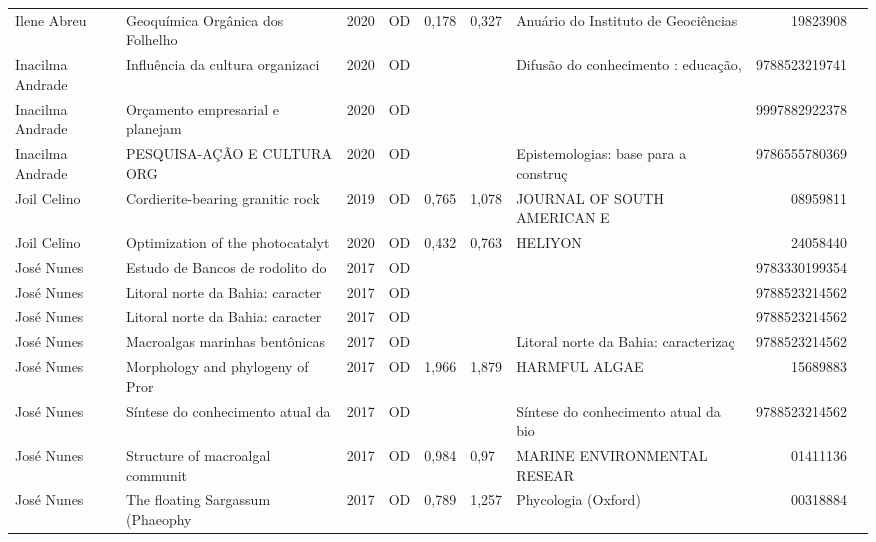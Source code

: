 \documentclass[12pt,brazil]{article}\usepackage[]{graphicx}\usepackage[]{xcolor}
\begin{document}
\begin{longtable}{lllrrllrr}
Ilene Abreu & Geoquímica Orgânica dos Folhelho & 2020 & OD & 0,178 & 0,327 & Anuário do Instituto de Geociências  & 19823908 \\
Inacilma Andrade & Influência da cultura organizaci & 2020 & OD &  &  & Difusão do conhecimento : educação,  & 9788523219741 \\
\rowcolor{ninval}\rowcolor{ninval}\rowcolor{ninval}\rowcolor{ninval}\rowcolor{ninval}\rowcolor{ninval}\rowcolor{ninval}\rowcolor{ninval}\rowcolor{ninval}\rowcolor{ninval}\rowcolor{ninval}\rowcolor{ninval}\rowcolor{ninval}\rowcolor{ninval}\rowcolor{ninval}\rowcolor{ninval}Inacilma Andrade & Orçamento empresarial e planejam & 2020 & OD &  &  &  & 9997882922378 \\
Inacilma Andrade & PESQUISA-AÇÃO E CULTURA ORG & 2020 & OD &  &  & Epistemologias: base para a construç & 9786555780369 \\
Joil Celino & Cordierite-bearing granitic rock & 2019 & OD & 0,765 & 1,078 & JOURNAL OF SOUTH AMERICAN E & 08959811 \\
Joil Celino & Optimization of the photocatalyt & 2020 & OD & 0,432 & 0,763 & HELIYON & 24058440 \\
José Nunes & Estudo de Bancos de rodolito do  & 2017 & OD &  &  &  & 9783330199354 \\
José Nunes & Litoral norte da Bahia: caracter & 2017 & OD &  &  &  & 9788523214562 \\
\rowcolor{duplic}\rowcolor{duplic}\rowcolor{duplic}\rowcolor{duplic}\rowcolor{duplic}\rowcolor{duplic}\rowcolor{duplic}\rowcolor{duplic}\rowcolor{duplic}\rowcolor{duplic}\rowcolor{duplic}\rowcolor{duplic}\rowcolor{duplic}\rowcolor{duplic}\rowcolor{duplic}\rowcolor{duplic}José Nunes & Litoral norte da Bahia: caracter & 2017 & OD &  &  &  & 9788523214562 \\
José Nunes & Macroalgas marinhas bentônicas & 2017 & OD &  &  & Litoral norte da Bahia: caracterizaç & 9788523214562 \\
José Nunes & Morphology and phylogeny of Pror & 2017 & OD & 1,966 & 1,879 & HARMFUL ALGAE & 15689883 \\
José Nunes & Síntese do conhecimento atual da & 2017 & OD &  &  & Síntese do conhecimento atual da bio & 9788523214562 \\
José Nunes & Structure of macroalgal communit & 2017 & OD & 0,984 & 0,97 & MARINE ENVIRONMENTAL RESEAR & 01411136 \\
José Nunes & The floating Sargassum (Phaeophy & 2017 & OD & 0,789 & 1,257 & Phycologia (Oxford) & 00318884 \\

\end{longtable}
\end{document}

